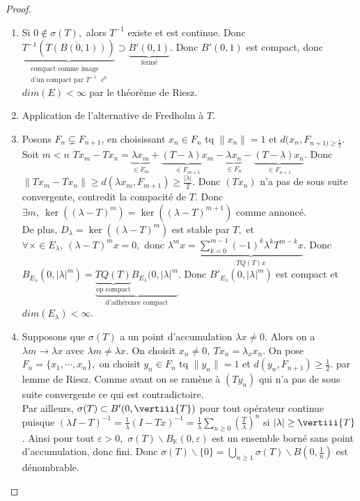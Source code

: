 \begin{proof}
    \begin{enumerate}[label=(\roman*)]
        \item Si $0\not\in \sigma(T),$ alors $T^{-1} $ existe et est continue. Donc \\
            $\underbrace{T^{-1} (\overline{T(B(0,1))})}_{\substack{\text{compact comme image}\\ \text{d'un compact par }T^{-1} \text{ $c^0$}}}\supset \underbrace{B'(0,1)}_{\text{fermé}}$. Donc $B'(0,1)$ est compact, donc $dim(E)<\infty $ par le théorème de Riesz.
        \item Application de l'alternative de Fredholm à $T.$
        \item Posons $F_n\subsetneq F_{n+1}$, en choisissant $x_n\in F_n$ tq $\|x_n\|=1$ et $d(x_n,F_{n+1)\ge \frac{1}{2}}.$\\
            Soit $m<n$ $Tx_m-Tx_n=\underbrace{\lambda x_m}_{\in F_m} + \underbrace{(T-\lambda)x_m}_{\in F_{m+1}}-\underbrace{\lambda x_n}_{\in F_n}-\underbrace{(T-\lambda)x_n}_{\in F_{n+1}}. $  Donc $\|Tx_m-Tx_n\|\ge d(\lambda x_m,F_{m+1})\ge \frac{|\lambda |}{2}. $ Donc $(Tx_n)$ n'a pas de sous suite convergente, contredit la compacité de $T.$ Donc $\exists m,\ \ker\left( (\lambda-T)^m \right) =\ker\left( (\lambda-T)^{m+1} \right) $ comme annoncé.\\
            De plus, $D_\lambda=\ker\left( (\lambda-T)^m \right) $ est stable par $T,$ et $\forall \times \in E_\lambda,\ (\lambda-T)^mx=0, $ donc $\lambda^mx=\underbrace{\sum\limits_{k=0}^{m-1} \left( -1 \right) ^k\lambda^kT^{m-k}x}_{TQ(T)x}$. Donc $B_{E_\lambda}(0,|\lambda| ^m)=\underbrace{\underbrace{TQ(T)}_{\text{op compact}}B_{E_\lambda}(0,|\lambda| ^m}_{\text{d'adhérence compact}}$. Donc $B'_{E_\lambda}(0,|\lambda|^m)$ est compact et $dim(E_\lambda)<\infty .$
        \item Supposons que $\sigma(T)$ a un point d'accumulation $\lambda x\neq 0.$ Alors on a $\lambda m\to \lambda x$ avec $\lambda m\neq \lambda x.$ On choisit $x_n\neq 0,\ Tx_n=\lambda _x x_n$. On pose $F_n=\{x_1,\cdots,x_n\} ,$ on choisit $y_n\in F_n$ tq $\|y_n\|=1$ et $d(y_n,F_{n+1})\ge \frac{1}{2}.$ par lemme de Riesz. Comme avant on se ramène à $(Ty_n)$ qui n'a pas de sous suite convergente ce qui est contradictoire. \\
            Par ailleurs, $\sigma(T)\subset B'(0, \vertiii{T})$ pour tout opérateur continue puisque $\left( \lambda I-T \right) ^{-1} =\frac{1}{\lambda}\left( I-T x \right) ^{-1} =\frac{1}{\lambda}\sum\limits_{n\ge 0}^{} \left( \frac{T}{\lambda} \right) ^n$ si $|\lambda| \ge \vertiii{T}$. Ainsi pour tout $\varepsilon >0,$ $\sigma(T)\backslash B_\mathbb{K}(0,\varepsilon )$ est un ensemble borné sans point d'accumulation, donc fini. Donc $\sigma(T)\backslash \{0\} =\bigcup\limits_{n\ge 1} \sigma(T)\backslash B(0,\frac{1}{n})$ est dénombrable.
    \end{enumerate}
\end{proof}

